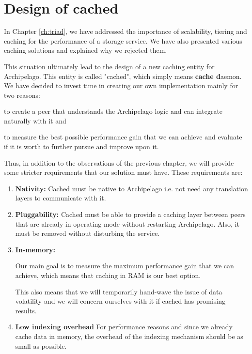 \chapter{Design of cached}\label{ch:cached-design}

In Chapter \ref{ch:triad}, we have addressed the importance of scalability, 
tiering and caching for the performance of a storage service. We have also 
presented various caching solutions and explained why we rejected them.

This situation ultimately lead to the design of a new caching entity for 
Archipelago.  This entity is called "cached", which simply means \textbf{cache 
	d}aemon. We have decided to invest time in creating our own implementation 
mainly for two reasons:
\begin{inparaenum}[(i)]
\item to create a peer that understands the Archipelago logic and can integrate 
	naturally with it and
\item to measure the best possible performance gain that we can achieve and 
	evaluate if it is worth to further pursue and improve upon it.
\end{inparaenum}

Thus, in addition to the observations of the previous chapter, we will provide 
some stricter requirements that our solution must have. These requirements are:

\begin{enumerate}
	\item \textbf{Nativity:} Cached must be native to Archipelago i.e.  not 
		need any translation layers to communicate with it.
	\item \textbf{Pluggability:} Cached must be able to provide a caching 
		layer between peers that are already in operating mode without 
		restarting Archipelago. Also, it must be removed without 
		disturbing the service.
	\item \textbf{In-memory:}
		\begin{comment}
		Our solution must cache requests in RAM, since the next fastest 
		tier, SSDs, are already being used in RADOS as a 
		journal.
		\end{comment}
		Our main goal is to measure the maximum performance gain that 
		we can achieve, which means that caching in RAM is our best 
		option.
		
		This also means that we will temporarily hand-wave the issue of 
		data volatility and we will concern ourselves with it if cached 
		has promising results.
	\item \textbf{Low indexing overhead} For performance reasons and since 
		we already cache data in memory, the overhead of the indexing 
		mechanism should be as small as possible.
\end{enumerate}

